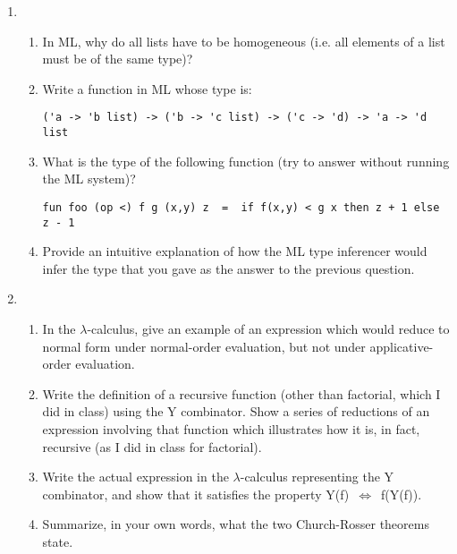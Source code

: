 \documentclass[11pt]{article}
\newcommand{\Lra}{\Leftrightarrow}
\newcommand{\lam}{\lambda}
\begin{document}
\begin{enumerate} 
\item %
\begin{enumerate} 
\item In ML, why do all lists have to be homogeneous (i.e. all elements of a list must be of the same type)?

\item Write a function in ML whose type is:
\begin{verbatim} 
('a -> 'b list) -> ('b -> 'c list) -> ('c -> 'd) -> 'a -> 'd list
\end{verbatim}
  

\item What is the type of the following function (try to answer without running the ML system)?
\begin{verbatim} 
fun foo (op <) f g (x,y) z  =  if f(x,y) < g x then z + 1 else z - 1
\end{verbatim} 


\item Provide an intuitive explanation of how the ML type inferencer would infer the type that you gave as the answer to the previous question.

\end{enumerate} 

\item 
\begin{enumerate} 
\item In the $\lam$-calculus, give an example of an expression which would reduce to normal form under normal-order evaluation, but not under applicative-order evaluation.


\item Write the definition of a recursive function (other than factorial, which I did in class) using the Y combinator.  Show a series of reductions of an expression involving that function which illustrates how it is, in fact, recursive (as I did in class for factorial).



\item Write the actual expression in the $\lam$-calculus representing the Y combinator, and show that it satisfies the property \mbox{Y(f) $\Lra$ f(Y(f))}.


\item 
Summarize, in your own words, what the two Church-Rosser theorems state.

\end{enumerate} 


\end{enumerate}
\end{document}

